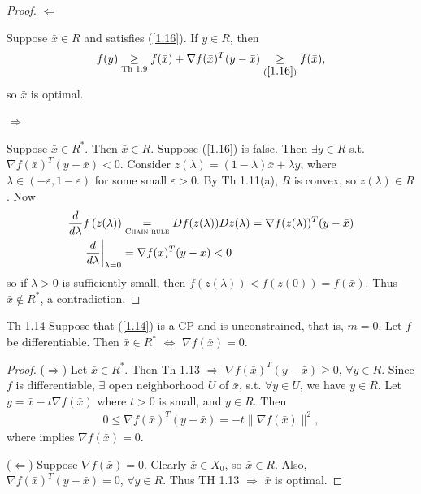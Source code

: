 \begin{proof}
    $\Longleftarrow$ 
    
    \noindent Suppose $\bar{x}\in R$ and satisfies (\ref{1.16}). If $y\in R$, then 
    \begin{align*}
        f(y) \underset{\text{Th 1.9}}{\ge} f(\bar{x}) + \nabla f(\bar{x})^T (y-\bar{x}) \underset{(\ref{1.16})}{\ge} f(\bar{x}),
    \end{align*}
    so $\bar{x}$ is optimal.

    $\Longrightarrow$ 
    
    \noindent Suppose $\bar{x}\in R^*$. Then $\bar{x}\in R$. Suppose (\ref{1.16}) is false. Then $\exists y\in R$ s.t. $\nabla f(\bar{x})^T (y-\bar{x}) < 0$. Consider $z(\lambda) = (1-\lambda)\bar{x} +\lambda y$, where $\lambda\in(-\varepsilon, 1-\varepsilon)$ for some small $\varepsilon>0$. By Th 1.11(a), $R$ is convex, so $z(\lambda)\in R$. Now
    \begin{align*}
        \frac{d}{d\lambda} f\left( z(\lambda)\right) &\underset{\textsc{Chain rule}}{=} Df(z(\lambda))Dz(\lambda) = \nabla f(z(\lambda))^T (y-\bar{x}) \\
        \frac{d}{d\lambda}\bigg|_{\lambda=0} &= \nabla f(\bar{x})^T (y-\bar{x}) < 0
    \end{align*}
    so if $\lambda>0$ is sufficiently small, then $f(z(\lambda)) < f(z(0)) = f(\bar{x})$. Thus $\bar{x}\notin R^*$, a contradiction.
\end{proof}

\begin{theorem}
    Th 1.14 Suppose that (\ref{1.14}) is a CP and is unconstrained, that is, $m = 0$. Let $f$ be differentiable. Then $\bar{x}\in R^* $ \quad $\Longleftrightarrow$ \quad $\nabla f(\bar{x}) = 0$.
\end{theorem}
\begin{proof}
    \par
    ($\Longrightarrow$) Let $\bar{x}\in R^*$. Then Th 1.13 $\Longrightarrow$ $\nabla f(\bar{x})^T(y-\bar{x}) \ge 0$, $\forall y\in R$. Since $f$ is differentiable, $\exists$ open neighborhood $U$ of $\bar{x}$, s.t. $\forall y\in U$, we have $y\in R$. Let $y = \bar{x} - t\nabla f(\bar{x})$ where $t>0$ is small, and $y\in R$. Then
    \begin{align*}
        0 \le \nabla f(\bar{x})^T (y-\bar{x}) = -t \|\nabla f(\bar{x})\|^2,
    \end{align*}
    where implies $\nabla f(\bar{x}) = 0$.
    \par
    ($\Longleftarrow$) Suppose $\nabla f(\bar{x}) = 0$. Clearly $\bar{x}\in X_0$, so $\bar{x}\in R$. Also, $\nabla f(\bar{x})^T(y-\bar{x}) = 0$, $\forall y\in R$. Thus TH 1.13 $\Longrightarrow$ $\bar{x}$ is optimal.
\end{proof}

